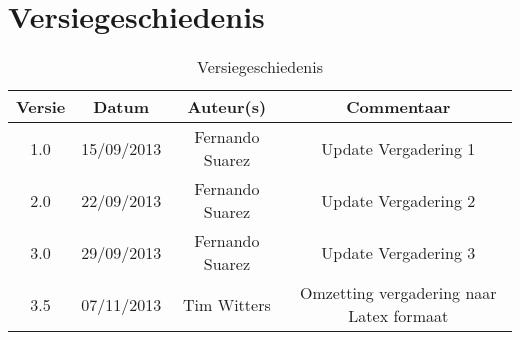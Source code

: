 \chapter{Versiegeschiedenis}

\begin{table}[htbp]
	\centering
	\caption{Versiegeschiedenis}	
	\begin{tabular} {|c|c|c|c|}
	    \hline
		\textbf{Versie} & \textbf{Datum} 	& \textbf{Auteur(s)} & \textbf{Commentaar} \\
		\hline
		1.0 & 15/09/2013 & Fernando Suarez & Update Vergadering 1 \\
		\hline
		2.0 & 22/09/2013 & Fernando Suarez & Update Vergadering 2 \\
		\hline
		3.0 & 29/09/2013 & Fernando Suarez & Update Vergadering 3 \\
		\hline
		3.5	& 07/11/2013 & Tim Witters & Omzetting vergadering naar Latex formaat \\
		\hline
	\end{tabular}
\end{table}